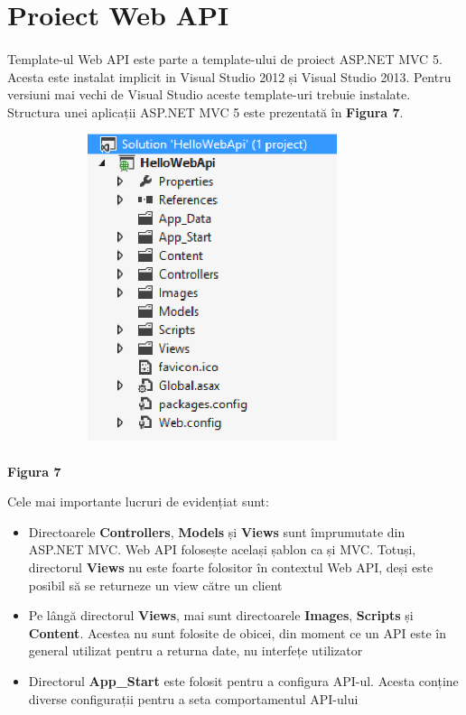 \section{Proiect Web API}

\paragraph{} Template-ul  Web API este parte a template-ului de proiect ASP.NET MVC 5. Acesta este instalat implicit in Visual Studio 2012 și Visual Studio 2013. Pentru versiuni mai vechi de Visual Studio aceste template-uri trebuie instalate. Structura unei aplicații ASP.NET MVC 5 este prezentată în \textbf{Figura 7}.

\begin{center}
\includegraphics[width=12cm,height=9cm,keepaspectratio]{imagini/StructuraAPI.eps} 
\paragraph{}
\textbf{Figura 7}
\end{center}\newpage


Cele mai importante lucruri de evidențiat sunt:

\begin{itemize}
\item Directoarele \textbf{Controllers}, \textbf{Models} și \textbf{Views} sunt împrumutate din ASP.NET MVC. Web API folosește același șablon ca și MVC. Totuși, directorul \textbf{Views} nu este foarte folositor în contextul Web API, deși este posibil să se returneze un view către un client
\item Pe lângă directorul \textbf{Views}, mai sunt directoarele \textbf{Images}, \textbf{Scripts} și \textbf{Content}. Acestea nu sunt folosite de obicei, din moment ce un API este în general utilizat pentru a returna date, nu interfețe utilizator
\item Directorul \textbf{App\_Start} este folosit pentru a configura API-ul. Acesta conține diverse configurații pentru a seta comportamentul API-ului
\end{itemize}

